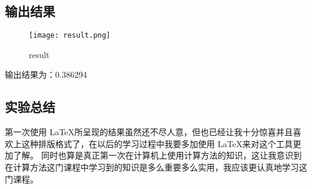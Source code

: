 \documentclass[UTF8]{ctexart}
\begin{document}
\subsection{输出结果}
\begin{figure*}[htbp]
	\begin{center}
	\texttt{[image: result.png]}
	\end{center}
	\caption{result}
\end{figure*} 
输出结果为：0.386294
\subsection{实验总结}
	第一次使用 \LaTeX 所呈现的结果虽然还不尽人意，但也已经让我十分惊喜并且喜欢上这种排版格式了，在以后的学习过程中我要多加使用 \LaTeX 来对这个工具更加了解。
	同时也算是真正第一次在计算机上使用计算方法的知识，这让我意识到在计算方法这门课程中学习到的知识是多么重要多么实用，我应该更认真地学习这门课程。
\end{document}
